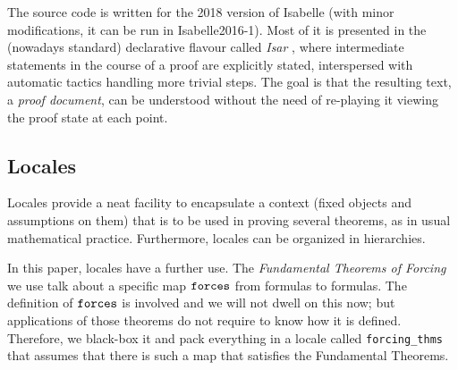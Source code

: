 \medskip
{}

\medskip

The source code is written for the 2018 version of Isabelle (with
minor modifications, it can be run in Isabelle2016-1). Most of it is
presented in the (nowadays standard) declarative flavour called
\emph{Isar} \cite{DBLP:conf/tphol/Wenzel99}, where intermediate
statements in the course of a proof are explicitly stated,
interspersed with automatic tactics handling more trivial steps. The
goal is that the resulting text, a \emph{proof document}, can be
understood without the need of re-playing it viewing the proof state
at each point.

\subsection{Locales}
\label{sec:locales}
Locales \cite{ballarin2010tutorial} provide a neat facility to
encapsulate a context (fixed objects and assumptions on them) that is
to be used in proving several theorems, as in usual mathematical
practice. Furthermore, locales can be organized in hierarchies. 

In this paper, locales have a further use. The \emph{Fundamental
  Theorems of Forcing} we use talk about a specific map $\mathop{\mathtt{forces}}$
from formulas to formulas. The definition of $\mathop{\mathtt{forces}}$ is involved
and we will not dwell on this now; but applications of those theorems
do not require to know how it is defined. Therefore, we black-box it
and pack everything in a locale called \texttt{forcing\_thms} that
assumes that there is such a 
map that satisfies the Fundamental Theorems.



